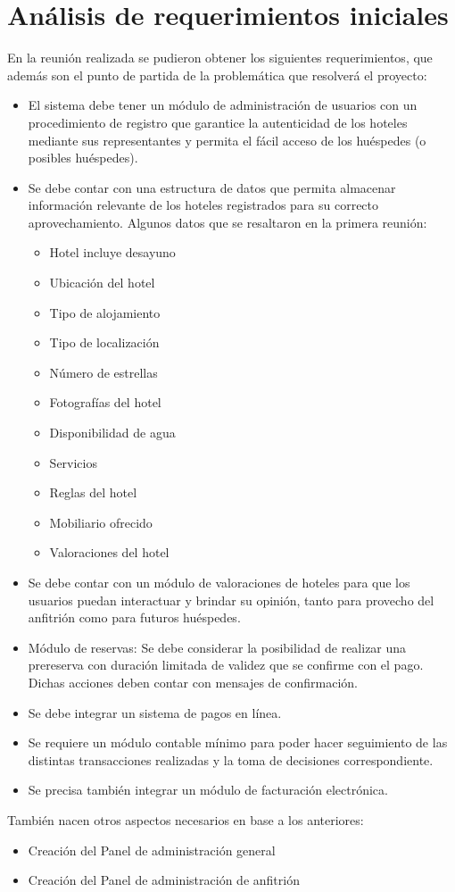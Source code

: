 \section{Análisis de requerimientos iniciales}

En la reunión realizada se pudieron obtener los siguientes requerimientos, que además son el punto de partida de la problemática que resolverá el proyecto:

\begin{itemize}
    \item El sistema debe tener un módulo de administración de usuarios con un procedimiento de registro que garantice la autenticidad de los hoteles mediante sus representantes y permita el fácil acceso de los huéspedes (o posibles huéspedes).
    \item Se debe contar con una estructura de datos que permita almacenar información relevante de los hoteles registrados para su correcto aprovechamiento. Algunos datos que se resaltaron en la primera reunión:
        \begin{itemize}
            \item Hotel incluye desayuno
            \item Ubicación del hotel
            \item Tipo de alojamiento
            \item Tipo de localización
            \item Número de estrellas
            \item Fotografías del hotel
            \item Disponibilidad de agua
            \item Servicios
            \item Reglas del hotel
            \item Mobiliario ofrecido
            \item Valoraciones del hotel
        \end{itemize}
    \item Se debe contar con un módulo de valoraciones de hoteles para que los usuarios puedan interactuar y brindar su opinión, tanto para provecho del anfitrión como para futuros huéspedes.
    \item Módulo de reservas: Se debe considerar la posibilidad de realizar una prereserva con duración limitada de validez que se confirme con el pago. Dichas acciones deben contar con mensajes de confirmación.
    \item Se debe integrar un sistema de pagos en línea.
    \item Se requiere un módulo contable mínimo para poder hacer seguimiento de las distintas transacciones realizadas y la toma de decisiones correspondiente.
    \item Se precisa también integrar un módulo de facturación electrónica.
\end{itemize}

También nacen otros aspectos necesarios en base a los anteriores: 

\begin{itemize}
    \item Creación del Panel de administración general
    \item Creación del Panel de administración de anfitrión
\end{itemize}

